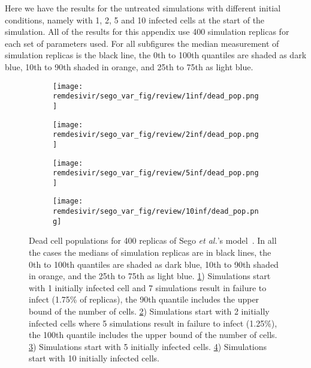 


Here we have the results for the untreated simulations with different initial conditions, namely with 1, 2, 5 and 10 infected cells at the start of the simulation. All of the results for this appendix use 400 simulation replicas for each set of parameters used. For all subfigures the median measurement of simulation replicas is the black line, the 0th to 100th quantiles are shaded as dark blue, 10th to 90th shaded in orange, and 25th to 75th as light blue.

\begin{figure}[H]

  \begin{subfigure}[b]{0.48\linewidth}
    \centering
    \texttt{[image: remdesivir/sego\_var\_fig/review/1inf/dead\_pop.png]} 
    \caption{} 
    \label{fig:res:var_sego:dead_pop:1inf} 
  \end{subfigure} 
  \hspace{\fill}  %
  \begin{subfigure}[b]{0.48\linewidth}
    \centering
    \texttt{[image: remdesivir/sego\_var\_fig/review/2inf/dead\_pop.png]} 
    \caption{} 
    \label{fig:res:var_sego:dead_pop:2inf} 
  \end{subfigure} 


    \vspace{4ex}
  \begin{subfigure}[b]{0.48\linewidth}
    \centering
    \texttt{[image: remdesivir/sego\_var\_fig/review/5inf/dead\_pop.png]} 
    \caption{} 
    \label{fig:res:var_sego:dead_pop:5inf} 
  \end{subfigure} 
  \hspace{\fill}
   \begin{subfigure}[b]{0.48\linewidth}
    \centering
    \texttt{[image: remdesivir/sego\_var\_fig/review/10inf/dead\_pop.png]} 
    \caption{} 
    \label{fig:res:var_sego:dead_pop:10inf} 
  \end{subfigure} 
\caption{Dead cell populations for 400 replicas of Sego \emph{et al.}'s model~\cite{sego_modular_2020}. In all the cases the medians of simulation replicas are in black lines, the 0th to 100th quantiles are shaded as dark blue, 10th to 90th shaded in orange, and the 25th to 75th as light blue. \ref{fig:res:var_sego:dead_pop:1inf}) Simulations start with 1 initially infected cell and 7 simulations result in failure to infect (1.75\% of replicas), the 90th quantile includes the upper bound of the number of cells. \ref{fig:res:var_sego:dead_pop:2inf}) Simulations start with 2 initially infected cells where 5 simulations result in failure to infect (1.25\%), the 100th quantile includes the upper bound of the number of cells. \ref{fig:res:var_sego:dead_pop:5inf}) Simulations start with 5 initially infected cells. \ref{fig:res:var_sego:dead_pop:10inf}) Simulations start with 10 initially infected cells.}\label{fig:res:var_sego:dead_pop} 
\end{figure}



